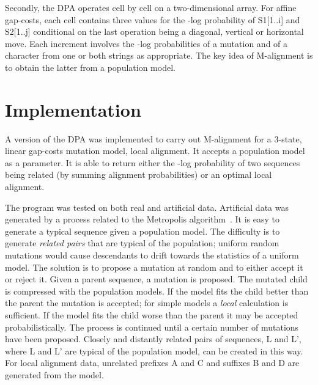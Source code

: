 \documentclass[letterpaper,11pt,oneside]{article}
\begin{document}
\begin{multicols}{2}
Secondly,
the DPA operates cell by cell on a two-dimensional array.
For affine gap-costs, each cell contains three values for the -log probability
of S1[1..i] and S2[1..j] conditional on the last operation
being a diagonal, vertical or horizontal move.
Each increment involves the -log probabilities of a mutation and
of a character from one or both strings as appropriate.
The key idea of M-alignment is to obtain the latter from a population model.


\section{Implementation} \label{sec:impl}

A version of the DPA was implemented to carry out M-alignment for
a 3-state, linear gap-costs mutation model, local alignment.
It accepts a population model as a parameter.
It is able to return either
the -log probability of two sequences being related
(by summing alignment probabilities) or
an optimal local alignment.

The program was tested on both real and artificial data.
Artificial data was generated by a process related to the
Metropolis algorithm~\cite{metropolis53}.
It is easy to generate a typical sequence given a population model.
The difficulty is to generate {\em related pairs} that are typical
of the population; uniform random mutations would cause
descendants to drift towards the statistics of a uniform model.
The solution is to propose a mutation at random and to either accept it
or reject it.
Given a parent sequence, a mutation is proposed.
The mutated child is compressed with the population models.
If the model fits the child better than the parent the mutation is accepted;
for simple models a {\em local} calculation is sufficient.
If the model fits the child worse than the parent it may be accepted
probabilistically.
The process is continued until a certain number of mutations have been proposed.
Closely and distantly related pairs of sequences, L and L',
where L and L' are typical of the population model, can be created in this way.
For local alignment data,
unrelated prefixes A and C and suffixes B and D are generated from the model.




\end{multicols}
\end{document}
